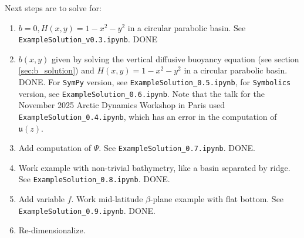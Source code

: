 \documentclass[10pt]{amsart}
\begin{document}
Next steps are to solve for:
\begin{enumerate}
\item $b=0, H(x,y) = 1 - x^2 - y^2$ in a circular parabolic basin. See \texttt{ExampleSolution\_v0.3.ipynb}.  DONE
\item $b(x,y)$ given by solving the vertical diffusive buoyancy equation (see section \ref{sec:b_solution}) and $H(x,y) = 1 - x^2 - y^2$ in a circular parabolic basin. DONE. For \texttt{SymPy} version, see \texttt{ExampleSolution\_0.5.ipynb}, for \texttt{Symbolics} version, see \texttt{ExampleSolution\_0.6.ipynb}. Note that the talk for the November 2025 Arctic Dynamics Workshop in Paris used \texttt{ExampleSolution\_0.4.ipynb}, which has an error in the computation of $\mathfrak{u}(z)$.
\item Add computation of $\Psi$. See \texttt{ExampleSolution\_0.7.ipynb}. DONE. 
\item Work example with non-trivial bathymetry, like a basin separated by ridge. See \texttt{ExampleSolution\_0.8.ipynb}. DONE. 
\item Add variable $f$. Work mid-latitude $\beta$-plane example with flat bottom. See \texttt{ExampleSolution\_0.9.ipynb}. DONE. 
\item Re-dimensionalize.
\end{enumerate}



\end{document}
